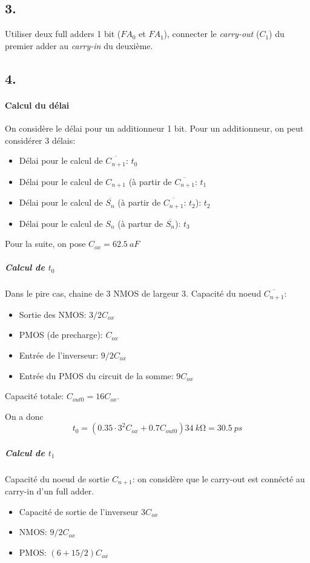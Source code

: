 \documentclass[frenchb,DIV=14]{scrartcl}
\begin{document}
\subsection*{3.}

Utiliser deux full adders 1 bit ($FA_0$ et $FA_1$), connecter le 
\emph{carry-out} ($C_1$) du premier adder au \emph{carry-in} du deuxième. 

\subsection*{4.}

\paragraph{Calcul du délai}

On considère le délai pour un additionneur 1 bit.
Pour un additionneur, on peut considérer 3 délais:
\begin{itemize}
    \item Délai pour le calcul de $\overline{C_{n+1}}$: $t_0$
    \item Délai pour le calcul de $C_{n+1}$ (à partir de $\overline{C_{n+1}}$: $t_1$
    \item Délai pour le calcul de $\overline{S_n}$ (à partir de $\overline{C_{n+1}}$: $t_2$): $t_2$
    \item Délai pour le calcul de $S_n$ (à partur de $\overline{S_n}$): $t_3$
\end{itemize}

Pour la suite, on pose $C_{ox} = \SI{62.5}{aF}$

\subparagraph{Calcul de $t_0$}
Dans le pire cas, chaine de 3 NMOS de largeur 3.
Capacité du noeud $\overline{C_{n+1}}$:
\begin{itemize}
\item Sortie des NMOS: $3/2 C_{ox}$
\item PMOS (de precharge): $C_{ox}$
\item Entrée de l'inverseur: $9/2 C_{ox}$
\item Entrée du PMOS du circuit de la somme: $9 C_{ox}$
\end{itemize}

Capacité totale: $C_{out0} = 16 C_{ox}$.

On a donc
\[t_0 = (0.35\cdot 3^2 C_{ox} + 0.7 C_{out0})\SI{34}{k\ohm} = \SI{30.5}{ps}\]

\subparagraph{Calcul de $t_1$}
Capacité du noeud de sortie $C_{n+1}$: on considère que le carry-out est
connécté au carry-in d'un full adder.
\begin{itemize}
\item Capacité de sortie de l'inverseur $3C_{ox}$
\item NMOS: $9/2 C_{ox}$
\item PMOS: $(6 + 15/2) C_{ox}$
\end{itemize}
\end{document}
